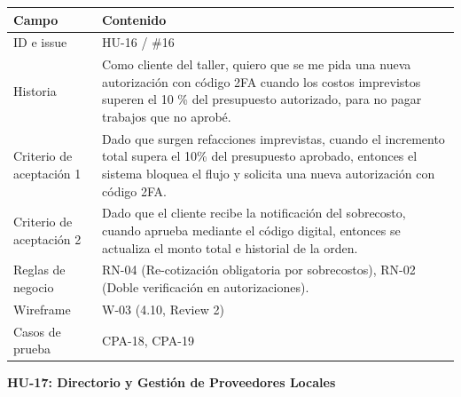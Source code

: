 {\def\LTcaptype{none} %
\begin{longtable}[]{@{}
  >{\raggedright\arraybackslash}p{}
  >{\raggedright\arraybackslash}p{}@{}}
\toprule\noalign{}
\begin{minipage}[b]{\linewidth}\raggedright
\textbf{Campo}
\end{minipage} & \begin{minipage}[b]{\linewidth}\raggedright
\textbf{Contenido}
\end{minipage} \\
\midrule\noalign{}
\endhead
\bottomrule\noalign{}
\endlastfoot
ID e issue & HU-16 / \#16 \\
Historia & Como cliente del taller, quiero que se me pida una nueva
autorización con código 2FA cuando los costos imprevistos superen el 10
\% del presupuesto autorizado, para no pagar trabajos que no aprobé. \\
Criterio de aceptación 1 & Dado que surgen refacciones imprevistas,
cuando el incremento total supera el 10\% del presupuesto aprobado,
entonces el sistema bloquea el flujo y solicita una nueva autorización
con código 2FA. \\
Criterio de aceptación 2 & Dado que el cliente recibe la notificación
del sobrecosto, cuando aprueba mediante el código digital, entonces se
actualiza el monto total e historial de la orden. \\
Reglas de negocio & RN-04 (Re-cotización obligatoria por sobrecostos),
RN-02 (Doble verificación en autorizaciones). \\
Wireframe & W-03 (4.10, Review 2) \\
Casos de prueba & CPA-18, CPA-19 \\
\end{longtable}
}

\textbf{HU-17: Directorio y Gestión de Proveedores Locales}

